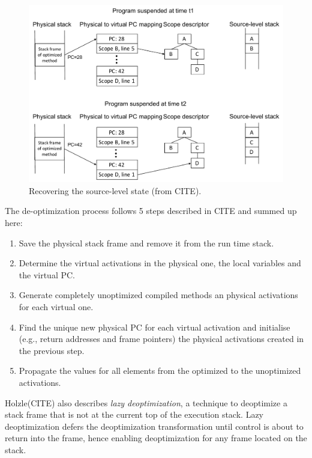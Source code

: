 \begin{figure}[h]
\centering
\includegraphics[scale=0.5]{Figures/Figure2}
\decoRule
\caption[Recovering the source-level state]{Recovering the source-level state (from CITE).}
\label{Holzle2}
\end{figure}


The de-optimization process follows 5 steps described in CITE and summed up here:
\begin{enumerate}
    \item Save the physical stack frame and remove it from the run time stack.
    \item Determine the virtual activations in the physical one, the local variables and the virtual PC.
    \item Generate completely unoptimized compiled methods an physical activations for each virtual one.
    \item Find the unique new physical PC for each virtual activation and initialise (e.g., return addresses and frame pointers) the physical activations created in the previous step.
    \item Propagate the values for all elements from the optimized to the unoptimized activations.
\end{enumerate}

Holzle(CITE) also describes \textit{lazy deoptimization}, a technique to deoptimize a stack frame that is not at the current top of the execution stack. 
Lazy deoptimization defers the deoptimization transformation until control is about to return into the frame, hence enabling deoptimization for any frame located on the stack.\\

